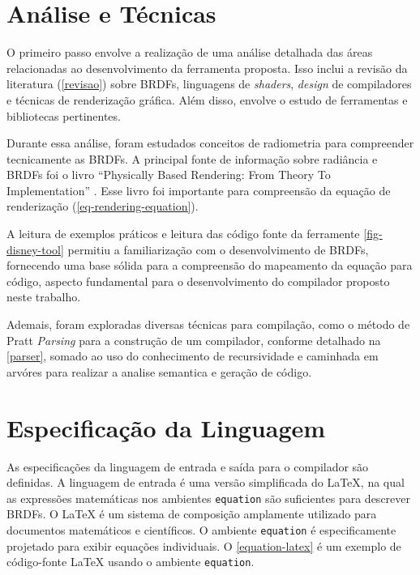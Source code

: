 \section{Análise e Técnicas} \label{analise}




O primeiro passo envolve a realização de uma análise detalhada das áreas relacionadas ao desenvolvimento da ferramenta proposta. Isso inclui a revisão da literatura (\autoref{revisao}) sobre BRDFs, linguagens de \textit{shaders}, \textit{design} de compiladores e técnicas de renderização gráfica. Além disso, envolve o estudo de ferramentas e bibliotecas pertinentes.

Durante essa análise, foram estudados conceitos de radiometria para compreender tecnicamente as BRDFs. A principal fonte de informação sobre radiância e BRDFs foi o livro ``Physically Based Rendering: From Theory To Implementation'' \cite{pbr}. Esse livro foi importante para compreensão da equação de renderização (\autoref{eq-rendering-equation}).

A leitura de exemplos práticos e leitura das código fonte da ferramente \autoref{fig-disney-tool} permitiu a familiarização com o desenvolvimento de BRDFs, fornecendo uma base sólida para a compreensão do mapeamento da equação para código, aspecto fundamental para o desenvolvimento do compilador proposto neste trabalho.

Ademais, foram exploradas diversas técnicas para compilação, como o método de Pratt \textit{Parsing} para a construção de um compilador, conforme detalhado na \autoref{parser}, somado ao uso do conhecimento de recursividade e caminhada em arvóres para realizar a analise semantica e geração de código.


\section{Especificação da Linguagem}\label{especificacao-linguagem}

As especificações da linguagem de entrada e saída para o compilador são definidas. A linguagem de entrada é uma versão simplificada do \LaTeX{}, na qual as expressões matemáticas nos ambientes \texttt{equation} são suficientes para descrever BRDFs. O \LaTeX{}  é um sistema de composição amplamente utilizado para documentos matemáticos e científicos. O ambiente \texttt{equation} é especificamente projetado para exibir equações individuais. O \autoref{equation-latex} é um exemplo de código-fonte \LaTeX{}  usando o ambiente \texttt{equation}.


